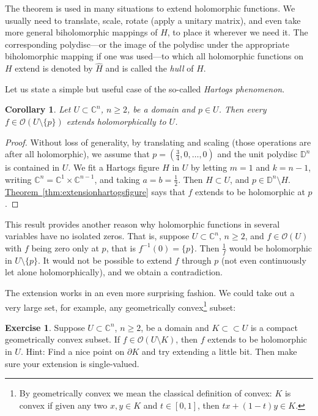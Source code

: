 \documentclass[12pt,openany]{book}
\newcommand{\C}{{\mathbb{C}}}
\newcommand{\D}{{\mathbb{D}}}
\newcommand{\sO}{{\mathscr{O}}}
\newcommand{\myindex}[1]{#1\index{#1}}
\theoremstyle{plain}
\newtheorem{cor}[thm]{Corollary}
\theoremstyle{remark}
\theoremstyle{definition}
\newenvironment{exbox}{%
    \def\FrameCommand{\vrule width 1pt \relax\hspace {10pt}}%
    \MakeFramed {\advance \hsize -\width \FrameRestore }%
}{%
    \endMakeFramed
}
\theoremstyle{exercise}
\newtheorem{exercise}{Exercise}[section]
\theoremstyle{example}
\newcommand{\thmref}[1]{\hyperref[#1]{Theorem~\ref*{#1}}}
\begin{document}
The theorem is used 
in many situations to extend holomorphic functions.
We usually need to
translate, scale, 
rotate (apply a unitary matrix),
and even take more general biholomorphic mappings
of $H$, to place it wherever we need it.  The corresponding polydisc---or the image of
the polydisc under the appropriate biholomorphic mapping if one was
used---to which all holomorphic functions on $H$ extend is denoted
by $\widehat{H}$ and is called the \emph{hull} of $H$.%

Let us state a simple but useful case of the so-called
\emph{\myindex{Hartogs phenomenon}}.

\begin{cor}
Let $U \subset \C^n$, $n \geq 2$, be a domain and $p \in U$.
Then every $f \in \sO(U \setminus \{ p \} )$
extends holomorphically to $U$.
\end{cor}

\begin{proof}
Without loss of generality,
by translating and scaling (those operations are after all holomorphic),
we assume that $p = (\frac{3}{4},0,\ldots,0)$
and the unit polydisc $\D^n$ is contained in $U$.  We fit a Hartogs figure $H$
in $U$
by letting $m=1$ and $k=n-1$, writing $\C^n = \C^{1} \times \C^{n-1}$,
and taking $a = b = \frac{1}{2}$.
Then $H \subset U$, and $p \in \D^n \setminus H$.
\thmref{thm:extensionhartogsfigure} says that
$f$ extends to be holomorphic at $p$.
\end{proof}

This result provides another reason why holomorphic functions in several
variables have no isolated zeros.  That is, suppose $U \subset \C^n$,
$n \geq 2$, and $f \in \sO(U)$ with $f$ being zero only at $p$, that
is $f^{-1}(0) = \{ p \}$.  Then $\frac{1}{f}$ would be holomorphic in
$U \setminus \{ p \}$.  It would not be possible to extend $f$
through $p$ (not even continuously let alone holomorphically),
and we obtain a contradiction.

\pagebreak[2]
The extension works in an even more surprising fashion.  We could
take out a very large set, for example, any geometrically
convex\footnote{By geometrically convex we mean the classical
definition of convex: $K$ is convex if given any two $x,y \in K$ and $t \in [0,1]$,
then $t x + (1-t)y \in K$.} subset:

\begin{exbox}
\begin{exercise} \label{exercise:convexhartogs}
Suppose $U \subset \C^n$, $n \geq 2$, be a domain and $K \subset \subset U$
is a compact geometrically
convex subset.
If $f \in \sO(U \setminus K)$,
then $f$ extends to be holomorphic in $U$.
Hint: Find a nice point on $\partial K$ and try extending a little bit.
Then make sure your extension is single-valued.
\end{exercise}
\end{exbox}
\end{document}
